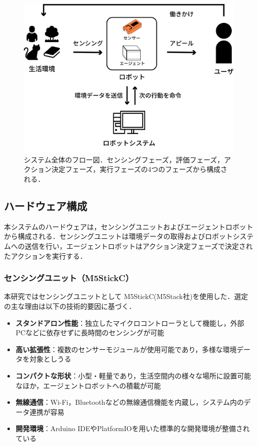 \documentclass{cuxarticle}
\begin{document}
\begin{figure}[h]
  \centering
  \includegraphics[keepaspectratio, height=0.3\textheight]{resources/system-flow.png}
  \caption[short]{システム全体のフロー図．センシングフェーズ，評価フェーズ，アクション決定フェーズ，実行フェーズの4つのフェーズから構成される．}
  \label{fig:system-flow}
\end{figure}

\subsection{ハードウェア構成}
本システムのハードウェアは，センシングユニットおよびエージェントロボットから構成される．センシングユニットは環境データの取得およびロボットシステムへの送信を行い，エージェントロボットはアクション決定フェーズで決定されたアクションを実行する．

\subsubsection{センシングユニット（M5StickC）}
本研究ではセンシングユニットとして M5StickC(M5Stack社)\cite{--M5StickC}を使用した．選定の主な理由は以下の技術的要因に基づく．

\begin{itemize}
  \item \textbf{スタンドアロン性能}：独立したマイクロコントローラとして機能し，外部PCなどに依存せずに長時間のセンシングが可能
  \item \textbf{高い拡張性}：複数のセンサーモジュールが使用可能であり，多様な環境データを対象としうる
  \item \textbf{コンパクトな形状}：小型・軽量であり，生活空間内の様々な場所に設置可能なほか，エージェントロボットへの積載が可能
  \item \textbf{無線通信}：Wi-Fi，Bluetoothなどの無線通信機能を内蔵し，システム内のデータ連携が容易
  \item \textbf{開発環境}：Arduino IDEやPlatformIOを用いた標準的な開発環境が整備されている
\end{itemize}
\end{document}
